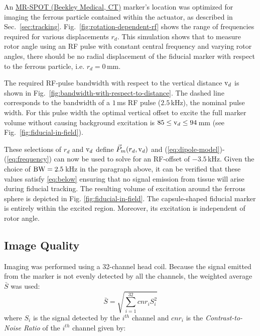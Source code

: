 \documentclass[journal]{IEEEtran}
\begin{document}
An \href{http://www.beekley.com/MRI/MRSPOTS.asp}{MR-SPOT (Beekley Medical, CT)} marker's location was optimized for imaging the ferrous particle contained within the actuator, as described in Sec.\ \ref{sec:tracking}. Fig.\ \ref{fig:rotation-dependent-rf} shows the range of frequencies required for various displacements $r_d$. This simulation shows that to measure rotor angle using an RF pulse with constant central frequency and varying rotor angles, there should be no radial displacement of the fiducial marker with respect to the ferrous particle, i.e. $r_d = 0\,$mm.
 
The required RF-pulse bandwidth with respect to the vertical distance $\textnormal{v}_d$ is shown in Fig.\ \ref{fig:bandwidth-with-respect-to-distance}. The dashed line corresponds to the bandwidth of a $1\,$ms RF pulse ($2.5\,$kHz), the nominal pulse width. For this pulse width the optimal vertical offset to excite the full marker volume without causing background excitation is $85\le \textnormal{v}_d \le 94\,$mm (see Fig.\ \ref{fig:fiducial-in-field}).

These selections of $r_d$ and $\textnormal{v}_d$ define $ \vec{P}_m(r_d,\textnormal{v}_d)$ and (\ref{eq:dipole-model})-(\ref{eq:frequency}) can now be used to solve for an RF-offset of $ -3.5\,$kHz. Given the choice of $\textnormal{BW} = 2.5\,$kHz in the paragraph above, it can be verified that these values satisfy \eqref{eq:below} ensuring that no signal emission from tissue will arise during fiducial tracking. The resulting volume of excitation around the ferrous sphere is depicted in Fig. \ref{fig:fiducial-in-field}. The capsule-shaped fiducial marker is entirely within the excited region. Moreover, its excitation is independent of rotor angle. 


\subsection{Image Quality} \label{subsec:CNR}


Imaging was performed using a 32-channel head coil. Because the signal emitted from the marker is not evenly detected by all the channels, the weighted average $\bar{S}$ was used:
 \begin{equation}
	\bar{S} = \sqrt{\sum_{i=1}^{32} cnr_i S_i^{2}}
\label{eq:CombinedSignal}
\end{equation}
where $S_i$ is the signal detected by the $i^{th}$ channel and $cnr_i$ is the \emph{Contrast-to-Noise Ratio} of the $i^{th}$ channel given by:
\end{document}
